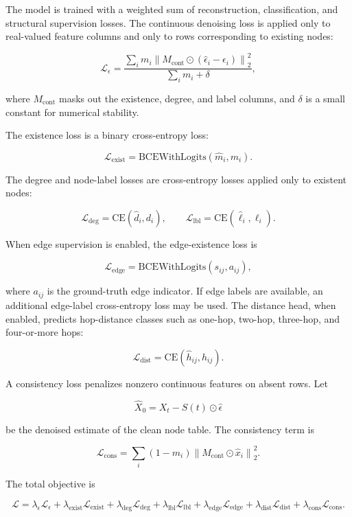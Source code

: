 The model is trained with a weighted sum of reconstruction, classification, and
structural supervision losses. The continuous denoising loss is applied only to
real-valued feature columns and only to rows corresponding to existing nodes:

\[
\mathcal{L}_{\epsilon}
=
\frac{
\sum_{i} m_i
\left\|
M_{\mathrm{cont}} \odot
(\hat{\epsilon}_i - \epsilon_i)
\right\|_2^2
}{
\sum_i m_i + \delta
},
\]

where \(M_{\mathrm{cont}}\) masks out the existence, degree, and label columns,
and \(\delta\) is a small constant for numerical stability.

The existence loss is a binary cross-entropy loss:

\[
\mathcal{L}_{\mathrm{exist}}
=
\mathrm{BCEWithLogits}(\hat m_i, m_i).
\]

The degree and node-label losses are cross-entropy losses applied only to
existent nodes:

\[
\mathcal{L}_{\mathrm{deg}}
=
\mathrm{CE}(\hat d_i, d_i),
\qquad
\mathcal{L}_{\mathrm{lbl}}
=
\mathrm{CE}(\hat \ell_i, \ell_i).
\]

When edge supervision is enabled, the edge-existence loss is

\[
\mathcal{L}_{\mathrm{edge}}
=
\mathrm{BCEWithLogits}(s_{ij}, a_{ij}),
\]

where \(a_{ij}\) is the ground-truth edge indicator. If edge labels are available,
an additional edge-label cross-entropy loss may be used. The distance head, when
enabled, predicts hop-distance classes such as one-hop, two-hop, three-hop, and
four-or-more hops:

\[
\mathcal{L}_{\mathrm{dist}}
=
\mathrm{CE}(\hat h_{ij}, h_{ij}).
\]

A consistency loss penalizes nonzero continuous features on absent rows. Let

\[
\hat X_0 = X_t - S(t)\odot \hat\epsilon
\]

be the denoised estimate of the clean node table. The consistency term is

\[
\mathcal{L}_{\mathrm{cons}}
=
\sum_i (1-m_i)
\left\|
M_{\mathrm{cont}} \odot \hat x_i
\right\|_2^2.
\]

The total objective is

\[
\mathcal{L}
=
\lambda_{\epsilon}\mathcal{L}_{\epsilon}
+
\lambda_{\mathrm{exist}}\mathcal{L}_{\mathrm{exist}}
+
\lambda_{\mathrm{deg}}\mathcal{L}_{\mathrm{deg}}
+
\lambda_{\mathrm{lbl}}\mathcal{L}_{\mathrm{lbl}}
+
\lambda_{\mathrm{edge}}\mathcal{L}_{\mathrm{edge}}
+
\lambda_{\mathrm{dist}}\mathcal{L}_{\mathrm{dist}}
+
\lambda_{\mathrm{cons}}\mathcal{L}_{\mathrm{cons}}.
\]

